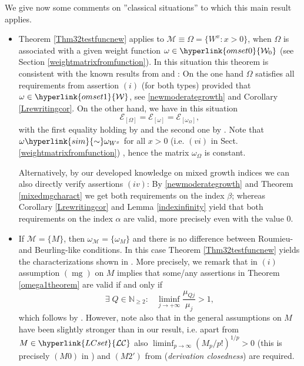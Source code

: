 \documentclass[10pt]{amsart}%
\numberwithin{equation}{section}
\theoremstyle{plain}
\newcommand{\NN}{\mathbb{N}}
\let\on=\operatorname
\begin{document}
We give now some comments on ''classical situations'' to which this main result applies.

\begin{itemize}
\item[$(a)$] Theorem \ref{Thm32testfuncnew} applies to $\mathcal{M}\equiv\Omega=\{W^x: x>0\}$, when $\Omega$ is associated with a given weight function $\omega\in\hyperlink{omset0}{\mathcal{W}_0}$ (see Section \ref{weightmatrixfromfunction}). In this situation this theorem is consistent with the known results from \cite{BonetMeiseMelikhov07} and \cite{compositionpaper}: On the one hand $\Omega$ satisfies all requirements from assertion $(i)$ (for both types) provided that $\omega\in\hyperlink{omset1}{\mathcal{W}}$, see \eqref{newmoderategrowth} and Corollary \ref{Lrewritingcor}. On the other hand, we have in this situation
$$\mathcal{E}_{[\Omega]}=\mathcal{E}_{[\omega]}=\mathcal{E}_{[\omega_{\Omega}]},$$
with the first equality holding by \cite[Theorem 5.14 $(2)$]{compositionpaper} and the second one by \cite[Lemma 5.7]{compositionpaper}. Note that $\omega\hyperlink{sim}{\sim}\omega_{W^x}$ for all $x>0$ (i.e. $(vi)$ in Sect. \ref{weightmatrixfromfunction}) , hence the matrix $\omega_{\Omega}$ is constant.\vspace{6pt}

Alternatively, by our developed knowledge on mixed growth indices we can also directly verify assertions $(iv)$: By \eqref{newmoderategrowth} and Theorem \ref{mixedmgcharact} we get both requirements on the index $\beta$; whereas Corollary \ref{Lrewritingcor} and Lemma \ref{indexinfinity} yield that both requirements on the index $\alpha$ are valid, more precisely even with the value $0$.

\item[$(b)$] If $\mathcal{M}=\{M\}$, then $\omega_{\mathcal{M}}=\{\omega_M\}$ and there is no difference between Roumieu- and Beurling-like conditions. In this case Theorem \ref{Thm32testfuncnew} yields the characterizations shown in \cite{BonetMeiseMelikhov07}. More precisely, we remark that in $(i)$ assumption \hyperlink{mg}{$(\on{mg})$} on $M$ implies that some/any assertions in Theorem \ref{omega1theorem} are valid if and only if
\begin{equation}\label{beta3}
\exists\;Q\in\NN_{\ge 2}:\;\;\;\liminf_{j\rightarrow+\infty}\frac{\mu_{Qj}}{\mu_j}>1,
\end{equation}
which follows by \cite[Prop. 3.4]{subaddlike}. However, note also that in \cite{BonetMeiseMelikhov07} the general assumptions on $M$ have been slightly stronger than in our result, i.e. apart from $M\in\hyperlink{LCset}{\mathcal{LC}}$ also $\liminf_{p\rightarrow\infty}(M_p/p!)^{1/p}>0$ (this is precisely $(M0)$ in \cite{BonetMeiseMelikhov07}) and $(M2')$ from \cite{Komatsu73} ({\itshape derivation closedness}) are required.\vspace{6pt}


\end{itemize}
\end{document}
